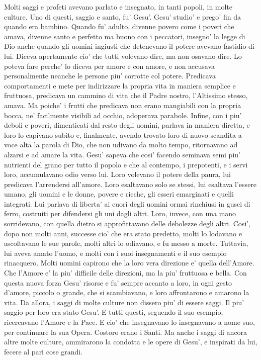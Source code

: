 {  Molti saggi e profeti avevano parlato e insegnato, in tanti popoli, in molte culture. Uno di questi, saggio e santo, fu' Gesu'. Gesu' studio' e prego' fin da quando era bambino. Quando fu' adulto, divenne povero come i poveri che amava, divenne santo e perfetto ma buono con i peccatori, insegno' la legge di Dio anche quando gli uomini ingiusti che detenevano il potere avevano fastidio di lui. Diceva apertamente cio' che tutti volevano dire, ma non osavano dire. Lo poteva fare perche' lo diceva per amore e con amore, e non accusava personalmente neanche le persone piu' corrotte col potere. Predicava comportamenti e mete per indirizzare la propria vita in maniera semplice e fruttuosa, predicava un cammino di vita che il Padre nostro, l'Altissimo stesso, amava. Ma poiche' i frutti che predicava non erano mangiabili con la propria bocca, ne' facilmente visibili ad occhio, adoperava parabole. Infine, con i piu' deboli e poveri, dimenticati dal resto degli uomini, parlava in maniera diretta, e loro lo capivano subito e, finalmente, avendo trovato loro di nuovo scandita a voce alta la parola di Dio, che non udivano da molto tempo, ritornavano ad alzarsi e ad amare la vita.
  Gesu' sapeva che cosi' facendo seminava semi piu' nutrienti del grano per tutto il popolo e che al contempo, i prepotenti, e i servi loro, accumulavano odio verso lui. Loro volevano il potere della paura, lui predicava l'arrendersi all'amore. Loro esaltavano solo se stessi, lui esaltava l'essere umano, gli uomini e le donne, povere e ricche, gli esseri emarginati e quelli integrati. Lui parlava di liberta' ai cuori degli uomini ormai rinchiusi in gusci di ferro, costruiti per difendersi gli uni dagli altri. Loro, invece, con una mano sorridevano, con quella dietro si approfittavano delle debolezze degli altri.
  Cosi', dopo non molti anni, successe cio' che era stato predetto, molti lo lodavano e ascoltavano le sue parole, molti altri lo odiavano, e fu messo a morte.
  Tuttavia, lui aveva amato l'uomo, e molti con i suoi insegnamenti e il suo esempio rinacquero. Molti uomini capirono che la loro vera direzione e' quella dell'Amore. Che l'Amore e' la piu' difficile delle direzioni, ma la piu' fruttuosa e bella. Con questa nuova forza Gesu' risorse e fu' sempre accanto a loro, in ogni gesto d'amore, piccolo o grande, che si scambiavano, e loro affrontarono e amarono la vita.
  Da allora, i saggi di molte culture non dissero piu' di essere saggi. Il piu' saggio per loro era stato Gesu'. E tutti questi, seguendo il suo esempio, ricercavano l'Amore e la Pace. E cio' che insegnavano lo insegnavano a nome suo, per continuare la sua Opera. Costoro erano i Santi. Ma anche i saggi di ancora altre molte culture, ammirarono la condotta e le opere di Gesu', e inspirati da lui, fecere al pari cose grandi.
}

